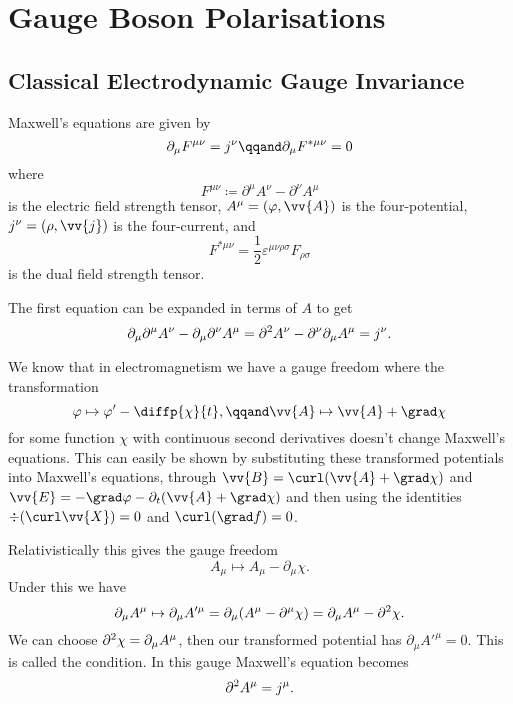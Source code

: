 \chapter{Gauge Boson Polarisations}
\section{Classical Electrodynamic Gauge Invariance}
Maxwell's equations are given by
\begin{equation}
    \partial_\mu F^{\mu\nu} = j^\nu \qqand \partial_\mu F^{*\mu\nu} = 0
\end{equation}
where
\begin{equation}
    F^{\mu\nu} \coloneqq \partial^\mu A^\nu - \partial^\nu A^\mu
\end{equation}
is the electric field strength tensor, \(A^\mu = (\varphi, \vv{A})\) is the four-potential, \(j^\nu = (\rho, \vv{j})\) is the four-current, and
\begin{equation}
    F^{*\mu\nu} = \frac{1}{2}\varepsilon^{\mu\nu\rho\sigma}F_{\rho\sigma}
\end{equation}
is the dual field strength tensor.

The first equation can be expanded in terms of \(A\) to get
\begin{equation}
    \partial_\mu\partial^\mu A^\nu - \partial_\mu\partial^\nu A^\mu = \partial^2 A^\nu - \partial^\nu\partial_\mu A^\mu = j^\nu.
\end{equation}

We know that in electromagnetism we have a gauge freedom where the transformation
\begin{equation}
    \varphi \mapsto \varphi' - \diffp{\chi}{t}, \qqand \vv{A} \mapsto \vv{A} + \grad \chi
\end{equation}
for some function \(\chi\) with continuous second derivatives doesn't change Maxwell's equations.
This can easily be shown by substituting these transformed potentials into Maxwell's equations, through \(\vv{B} = \curl (\vv{A} + \grad\chi)\) and \(\vv{E} = -\grad\varphi -\partial_t(\vv{A} + \grad\chi)\) and then using the identities \(\div(\curl\vv{X}) = 0\) and \(\curl(\grad f) = 0\).

Relativistically this gives the gauge freedom
\begin{equation}
    A_\mu \mapsto A_\mu - \partial_\mu \chi.
\end{equation}
Under this we have
\begin{equation}
    \partial_\mu A^\mu \mapsto \partial_\mu A'^\mu = \partial_\mu (A^\mu - \partial^\mu \chi) = \partial_\mu A^\mu - \partial^2 \chi.
\end{equation}
We can choose \(\partial^2\chi = \partial_\mu A^\mu\), then our transformed potential has \(\partial_\mu A'^\mu = 0\).
This is called the  condition.
In this gauge Maxwell's equation becomes
\begin{equation}
    \partial^2 A^\mu = j^\mu.
\end{equation}


